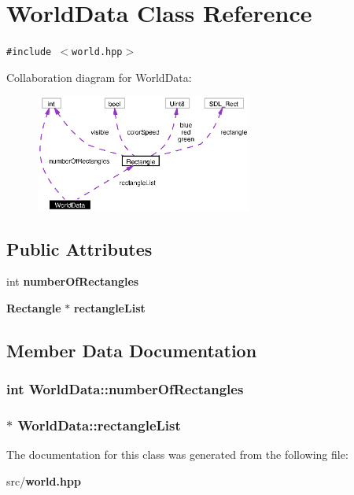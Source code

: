 \section{World\-Data Class Reference}
\label{classWorldData}
{\tt \#include $<$world.hpp$>$}

Collaboration diagram for World\-Data:\begin{figure}[H]
\begin{center}
\leavevmode
\includegraphics[width=201pt]{classWorldData__coll__graph}
\end{center}
\end{figure}
\subsection*{Public Attributes}
\begin{CompactItemize}
\item 
int {\bf number\-Of\-Rectangles}
\item 
{\bf Rectangle} $\ast$ {\bf rectangle\-List}
\end{CompactItemize}


\subsection{Member Data Documentation}
\subsubsection{\setlength{\rightskip}{0pt plus 5cm}int {\bf World\-Data::number\-Of\-Rectangles}}\label{classWorldData_o0}


\subsubsection{$\ast$ {\bf World\-Data::rectangle\-List}}\label{classWorldData_o1}




The documentation for this class was generated from the following file:\begin{CompactItemize}
\item 
src/{\bf world.hpp}\end{CompactItemize}
